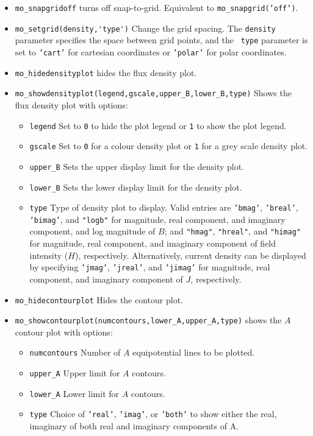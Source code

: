 \begin{itemize}
\item{\tt mo\_snapgridoff} turns off snap-to-grid. Equivalent to {\tt mo\_snapgrid('off')}.

\item{\verb+mo_setgrid(density,'type')+} Change the grid spacing.  The {\tt density}
parameter specifies the space between grid points, and the {\tt
type} parameter is set to {\tt 'cart'} for cartesian coordinates or
{\tt 'polar'} for polar coordinates.
\item{\verb+mo_hidedensityplot+} hides the flux density plot.
\item{\verb+mo_showdensityplot(legend,gscale,upper_B,lower_B,type)+}
Shows the flux density plot with options:
        \begin{itemize}
        \item {\tt legend} Set to {\tt 0} to hide the plot legend or {\tt 1} to show the plot
        legend.
        \item {\tt gscale} Set to {\tt 0} for a colour density plot or {\tt 1} for a grey scale density
        plot.
        \item{\verb+upper_B+} Sets the upper display limit for the density
        plot.
        \item{\verb+lower_B+} Sets the lower display limit for the density
        plot.
        \item{\tt type} Type of density plot to display. Valid
        entries are {\tt 'bmag'}, {\tt 'breal'}, {\tt 'bimag'}, and {\tt "logb"} for
        magnitude, real component, and imaginary component, and log magnitude of $B$;
        and {\tt "hmag"}, {\tt "hreal"}, and {\tt "himag"} for
        magnitude, real component, and imaginary component of field intensity ($H$),
        respectively.  Alternatively, current density can be
        displayed by specifying {\tt 'jmag'}, {\tt 'jreal'}, and {\tt 'jimag'} for
        magnitude, real component, and imaginary component of $J$,
        respectively.
        \end{itemize}
\item{\verb+mo_hidecontourplot+} Hides the contour plot.
\item{\verb+mo_showcontourplot(numcontours,lower_A,upper_A,type)+}
shows the $A$ contour plot with options:
        \begin{itemize}
        \item{\tt numcontours} Number of $A$ equipotential lines
        to be plotted.
        \item{\verb+upper_A+} Upper limit for $A$ contours.
        \item{\verb+lower_A+} Lower limit for $A$ contours.
                \item{\verb+type+} Choice of {\tt 'real'}, {\tt 'imag'}, or {\tt 'both'}
                        to show either the real, imaginary of both real and imaginary components of A.
        \end{itemize}


\end{itemize}
